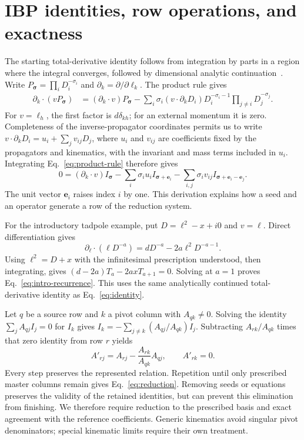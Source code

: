 \section{IBP identities, row operations, and exactness}
\label{app:derivation}
The starting total-derivative identity follows from integration by parts in a region where the integral converges, followed by dimensional analytic continuation~\cite{ChetyrkinTkachov,Weinzierl2022}. Write $P_{\boldsymbol\sigma}=\prod_iD_i^{-\sigma_i}$ and $\partial_k=\partial/\partial\ell_k$. The product rule gives
\begin{align}
 \partial_k\!\cdot(vP_{\boldsymbol\sigma})
 &=(\partial_k\!\cdot v)P_{\boldsymbol\sigma}
 -\sum_i\sigma_i(v\!\cdot\partial_kD_i)
 D_i^{-\sigma_i-1}\prod_{j\ne i}D_j^{-\sigma_j}.
 \label{eq:product-rule}
\end{align}
For $v=\ell_h$, the first factor is $d\delta_{kh}$; for an external momentum it is zero. Completeness of the inverse-propagator coordinates permits us to write $v\!\cdot\partial_kD_i=u_i+\sum_jv_{ij}D_j$, where $u_i$ and $v_{ij}$ are coefficients fixed by the propagators and kinematics, with the invariant and mass terms included in $u_i$. Integrating Eq.~\eqref{eq:product-rule} therefore gives
\begin{equation}
 0=(\partial_k\!\cdot v)I_{\boldsymbol\sigma}
 -\sum_i\sigma_i u_i I_{\boldsymbol\sigma+\boldsymbol e_i}
 -\sum_{i,j}\sigma_i v_{ij}
 I_{\boldsymbol\sigma+\boldsymbol e_i-\boldsymbol e_j}.
 \label{eq:index-shifts-new}
\end{equation}
The unit vector $\boldsymbol e_i$ raises index $i$ by one. This derivation explains how a seed and an operator generate a row of the reduction system.

For the introductory tadpole example, put $D=\ell^2-x+i0$ and $v=\ell$. Direct differentiation gives
\begin{equation}
 \partial_\ell\!\cdot(\ell D^{-a})=dD^{-a}-2a\ell^2D^{-a-1}.
 \label{eq:tadpole-derivative-proof}
\end{equation}
Using $\ell^2=D+x$ with the infinitesimal prescription understood, then integrating, gives $(d-2a)T_a-2axT_{a+1}=0$. Solving at $a=1$ proves Eq.~\eqref{eq:intro-recurrence}. This uses the same analytically continued total-derivative identity as Eq.~\eqref{eq:identity}.

Let $q$ be a source row and $k$ a pivot column with $A_{qk}\ne0$. Solving the identity $\sum_jA_{qj}I_j=0$ for $I_k$ gives $I_k=-\sum_{j\ne k}(A_{qj}/A_{qk})I_j$. Subtracting $A_{rk}/A_{qk}$ times that zero identity from row $r$ yields
\begin{equation}
 A'_{rj}=A_{rj}-\frac{A_{rk}}{A_{qk}}A_{qj},\qquad A'_{rk}=0.
 \label{eq:row-new}
\end{equation}
Every step preserves the represented relation. Repetition until only prescribed master columns remain gives Eq.~\eqref{eq:reduction}. Removing seeds or equations preserves the validity of the retained identities, but can prevent this elimination from finishing. We therefore require reduction to the prescribed basis and exact agreement with the reference coefficients. Generic kinematics avoid singular pivot denominators; special kinematic limits require their own treatment.


